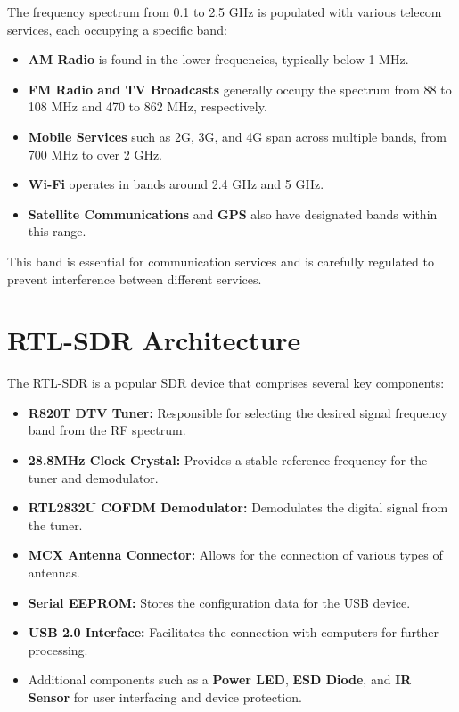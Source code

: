 The frequency spectrum from 0.1 to 2.5 GHz is populated with various telecom services, each occupying a specific band:
\begin{itemize}
    \item \textbf{AM Radio} is found in the lower frequencies, typically below 1 MHz.
    \item \textbf{FM Radio and TV Broadcasts} generally occupy the spectrum from 88 to 108 MHz and 470 to 862 MHz, respectively.
    \item \textbf{Mobile Services} such as 2G, 3G, and 4G span across multiple bands, from 700 MHz to over 2 GHz.
    \item \textbf{Wi-Fi} operates in bands around 2.4 GHz and 5 GHz.
    \item \textbf{Satellite Communications} and \textbf{GPS} also have designated bands within this range.
\end{itemize}
This band is essential for communication services and is carefully regulated to prevent interference between different services.

\section*{RTL-SDR Architecture}

The RTL-SDR is a popular SDR device that comprises several key components:
\begin{itemize}
    \item \textbf{R820T DTV Tuner:} Responsible for selecting the desired signal frequency band from the RF spectrum.
    \item \textbf{28.8MHz Clock Crystal:} Provides a stable reference frequency for the tuner and demodulator.
    \item \textbf{RTL2832U COFDM Demodulator:} Demodulates the digital signal from the tuner.
    \item \textbf{MCX Antenna Connector:} Allows for the connection of various types of antennas.
    \item \textbf{Serial EEPROM:} Stores the configuration data for the USB device.
    \item \textbf{USB 2.0 Interface:} Facilitates the connection with computers for further processing.
    \item Additional components such as a \textbf{Power LED}, \textbf{ESD Diode}, and \textbf{IR Sensor} for user interfacing and device protection.
\end{itemize}

